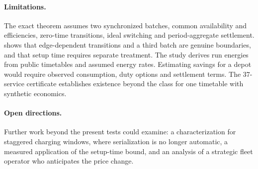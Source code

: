 \documentclass[11pt]{article}
\theoremstyle{definition}\newtheorem{definition}[theorem]{Definition}
\theoremstyle{remark}\newtheorem{remark}[theorem]{Remark}
\begin{document}
\paragraph{Limitations.} The exact theorem assumes two synchronized batches,
common availability and efficiencies, zero-time transitions, ideal switching
and period-aggregate settlement.  shows that
edge-dependent transitions and a third batch are genuine boundaries, and that
setup time requires separate treatment. The study derives run energies from
public timetables and assumed energy rates. Estimating savings for a depot
would require observed consumption, duty options and settlement terms.
The 37-service certificate establishes
existence beyond the class for one timetable with synthetic economics.

\paragraph{Open directions.} Further work beyond the present tests could examine: a
characterization for staggered charging windows, where serialization is no
longer automatic, a measured application of the setup-time bound, and an
analysis of a strategic fleet operator who anticipates the price change.




\appendix

\end{document}
